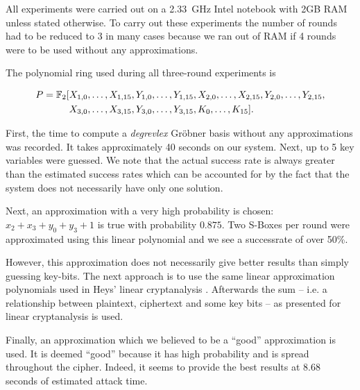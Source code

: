 All experiments were carried out on a 2.33~GHz Intel \CTD notebook with 2GB RAM unless stated otherwise. To carry out these experiments the number of rounds had to be reduced to $3$ in many cases because we ran out of RAM if 4 rounds were to be used without any approximations.

The polynomial ring used during all three-round experiments is

\begin{align*}
P = \mathbb{F}_{2}[&X_{1,0}, \dots, X_{1,15}, Y_{1,0}, \dots, Y_{1,15}, X_{2,0}, \dots, X_{2,15}, Y_{2,0}, \dots, Y_{2,15}, \\
&X_{3,0}, \dots, X_{3,15}, Y_{3,0}, \dots, Y_{3,15}, K_{0}, \dots, K_{15}].\\
\end{align*}

First, the time to compute a \emph{degrevlex} Gröbner basis without any approximations was recorded. It takes approximately 40 seconds on our system. Next, up to 5 key variables were guessed. We note that the actual success rate is always greater than the estimated success rates which can be accounted for by the fact that the system does not necessarily have only one solution.

Next, an approximation with a very high probability is chosen: $x_2 + x_3 + y_0 + y_3 + 1$ is true with probability $0.875$. Two S-Boxes per round were approximated using this linear polynomial and we see a successrate of over 50\%.

However, this approximation does not necessarily give better results than simply guessing key-bits. The next approach is to use the same linear approximation polynomials used in Heys'  linear cryptanalysis \cite{Heys2002}. Afterwards the sum -- i.e. a relationship between plaintext, ciphertext and some key bits -- as presented for linear cryptanalysis is used.

Finally, an approximation which we believed to be a ``good'' approximation is used. It is deemed ``good'' because it has high probability and is spread throughout the cipher. Indeed, it seems to provide the best results at 8.68 seconds of estimated attack time.

